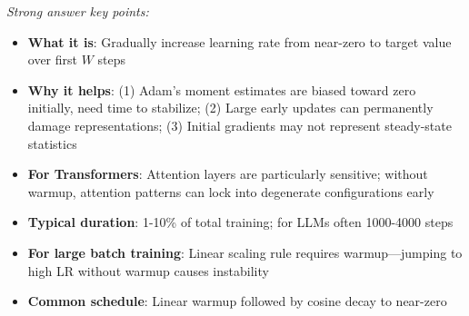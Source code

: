 \documentclass[../../main.tex]{subfiles}
\begin{document}
\begin{interviewquestions}
\textit{Strong answer key points:}
\begin{itemize}
    \item \textbf{What it is}: Gradually increase learning rate from near-zero to target value over first $W$ steps
    \item \textbf{Why it helps}: (1) Adam's moment estimates are biased toward zero initially, need time to stabilize; (2) Large early updates can permanently damage representations; (3) Initial gradients may not represent steady-state statistics
    \item \textbf{For Transformers}: Attention layers are particularly sensitive; without warmup, attention patterns can lock into degenerate configurations early
    \item \textbf{Typical duration}: 1-10\% of total training; for LLMs often 1000-4000 steps
    \item \textbf{For large batch training}: Linear scaling rule requires warmup---jumping to high LR without warmup causes instability
    \item \textbf{Common schedule}: Linear warmup followed by cosine decay to near-zero
\end{itemize}

\end{interviewquestions}
\end{document}
